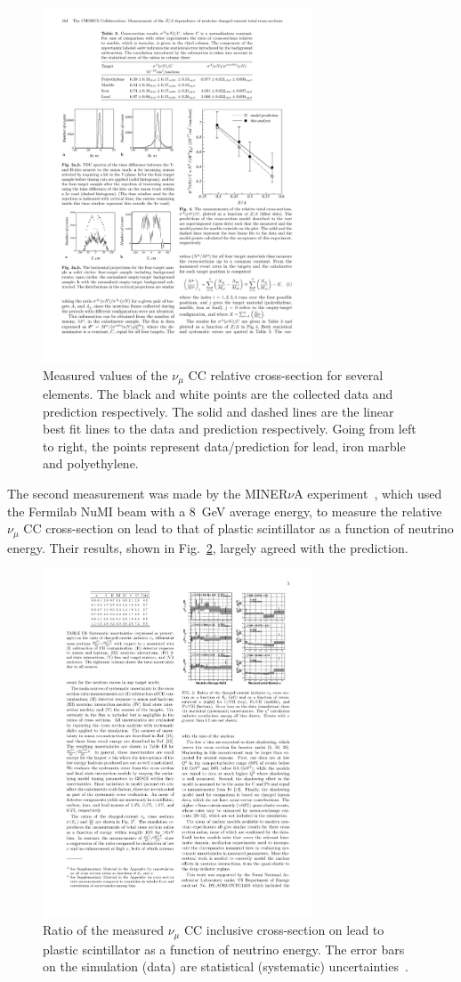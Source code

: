 \begin{figure}%
  \centering
  \includegraphics[width=8cm]{images/neutrino_interactions/CHORUS_XSec.pdf}
  \caption{Measured values of the $\nu_\mu$ CC relative cross-section for several elements.  The black and white points are the collected data and prediction respectively.  The solid and dashed lines are the linear best fit lines to the data and prediction respectively.  Going from left to right, the points represent data/prediction for lead, iron marble and polyethylene.}
  \label{fig:CHORUSXSec}
\end{figure}
The second measurement was made by the MINER$\nu$A experiment~\cite{PhysRevLett.112.231801}, which used the Fermilab NuMI beam with a 8~GeV average energy, to measure the relative $\nu_\mu$ CC cross-section on lead to that of plastic scintillator as a function of neutrino energy.  Their results, shown in Fig.~\ref{fig:MINERvAXSec}, largely agreed with the prediction.
\begin{figure}%
  \centering
  \includegraphics[width=8cm]{images/neutrino_interactions/MINERvA_XSec.pdf}
  \caption{Ratio of the measured $\nu_\mu$ CC inclusive cross-section on lead to plastic scintillator as a function of neutrino energy.  The error bars on the simulation (data) are statistical (systematic) uncertainties~\cite{PhysRevLett.112.231801}.}
  \label{fig:MINERvAXSec}
\end{figure}
